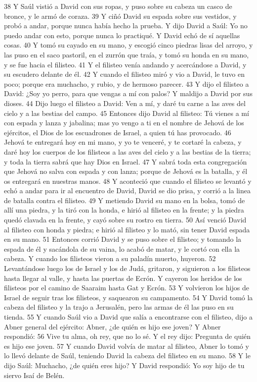 38 Y Saúl vistió a David con sus ropas, y puso sobre su cabeza un casco de bronce, y le armó de coraza.
39 Y ciñó David su espada sobre sus vestidos, y probó a andar, porque nunca había hecho la prueba. Y dijo David a Saúl: Yo no puedo andar con esto, porque nunca lo practiqué. Y David echó de sí aquellas cosas.
40 Y tomó su cayado en su mano, y escogió cinco piedras lisas del arroyo, y las puso en el saco pastoril, en el zurrón que traía, y tomó su honda en su mano, y se fue hacia el filisteo.
41 Y el filisteo venía andando y acercándose a David, y su escudero delante de él.
42 Y cuando el filisteo miró y vio a David, le tuvo en poco; porque era muchacho, y rubio, y de hermoso parecer.
43 Y dijo el filisteo a David: ¿Soy yo perro, para que vengas a mí con palos? Y maldijo a David por sus dioses.
44 Dijo luego el filisteo a David: Ven a mí, y daré tu carne a las aves del cielo y a las bestias del campo.
45 Entonces dijo David al filisteo: Tú vienes a mí con espada y lanza y jabalina; mas yo vengo a ti en el nombre de Jehová de los ejércitos, el Dios de los escuadrones de Israel, a quien tú has provocado.
46 Jehová te entregará hoy en mi mano, y yo te venceré, y te cortaré la cabeza, y daré hoy los cuerpos de los filisteos a las aves del cielo y a las bestias de la tierra; y toda la tierra sabrá que hay Dios en Israel.
47 Y sabrá toda esta congregación que Jehová no salva con espada y con lanza; porque de Jehová es la batalla, y él os entregará en nuestras manos.
48 Y aconteció que cuando el filisteo se levantó y echó a andar para ir al encuentro de David, David se dio prisa, y corrió a la linea de batalla contra el filisteo.
49 Y metiendo David su mano en la bolsa, tomó de allí una piedra, y la tiró con la honda, e hirió al filisteo en la frente; y la piedra quedó clavada en la frente, y cayó sobre su rostro en tierra.
50 Así venció David al filisteo con honda y piedra; e hirió al filisteo y lo mató, sin tener David espada en su mano.
51 Entonces corrió David y se puso sobre el filisteo; y tomando la espada de él y sacándola de su vaina, lo acabó de matar, y le cortó con ella la cabeza. Y cuando los filisteos vieron a su paladín muerto, huyeron.
52 Levantándose luego los de Israel y los de Judá, gritaron, y siguieron a los filisteos hasta llegar al valle, y hasta las puertas de Ecrón. Y cayeron los heridos de los filisteos por el camino de Saaraim hasta Gat y Ecrón.
53 Y volvieron los hijos de Israel de seguir tras los filisteos, y saquearon su campamento. 
54 Y David tomó la cabeza del filisteo y la trajo a Jerusalén, pero las armas de él las puso en su tienda.
55 Y cuando Saúl vio a David que salía a encontrarse con el filisteo, dijo a Abner general del ejército: Abner, ¿de quién es hijo ese joven? Y Abner respondió:
56 Vive tu alma, oh rey, que no lo sé. Y el rey dijo: Pregunta de quién es hijo ese joven.
57 Y cuando David volvía de matar al filisteo, Abner lo tomó y lo llevó delante de Saúl, teniendo David la cabeza del filisteo en su mano.
58 Y le dijo Saúl: Muchacho, ¿de quién eres hijo? Y David respondió: Yo soy hijo de tu siervo Isaí de Belén.


